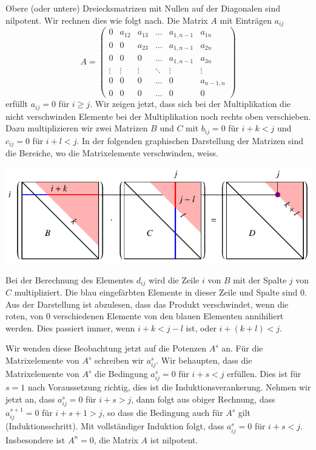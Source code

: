 \begin{beispiel}
Obere (oder untere) Dreiecksmatrizen mit Nullen auf der Diagonalen
sind nilpotent.
%
Wir rechnen dies wie folgt nach.
Die Matrix $A$ mit Einträgen $a_{i\!j}$
\[
A=\begin{pmatrix}
  0   &a_{12}&a_{13}&\dots &a_{1,n-1}&a_{1n}   \\
  0   &  0   &a_{23}&\dots &a_{1,n-1}&a_{2n}   \\
  0   &  0   &  0   &\dots &a_{1,n-1}&a_{3n}   \\
\vdots&\vdots&\vdots&\ddots&\vdots   &\vdots   \\
  0   &  0   &  0   &\dots &  0      &a_{n-1,n}\\
  0   &  0   &  0   &\dots &  0      &  0
\end{pmatrix}
\]
erfüllt $a_{i\!j}=0$ für $i\ge j$.
Wir zeigen jetzt, dass sich bei der Multiplikation die nicht
verschwinden Elemente bei der Multiplikation noch rechts oben
verschieben.
Dazu multiplizieren wir zwei Matrizen $B$ und $C$ mit
$b_{i\!j}=0$ für $i+k<j$ und $c_{i\!j}=0$ für $i+l<j$.
In der folgenden graphischen Darstellung der Matrizen sind die
Bereiche, wo die Matrixelemente verschwinden, weiss.
\begin{center}
\includegraphics{chapters/40-eigenwerte/images/nilpotent.pdf}
\end{center}
Bei der Berechnung des Elementes $d_{i\!j}$ wird die Zeile $i$ von $B$
mit der Spalte $j$ von $C$ multipliziert.
Die blau eingefärbten Elemente in dieser Zeile und Spalte sind $0$.
Aus der Darstellung ist abzulesen, dass das Produkt verschwindet, 
wenn die roten, von $0$ verschiedenen Elemente von den blauen
Elementen annihiliert werden.
Dies passiert immer, wenn $i+k<j-l$ ist, oder $i+(k+l)< j$.

Wir wenden diese Beobachtung jetzt auf die Potenzen $A^s$ an.
Für die Matrixelemente von $A^s$ schreiben wir $a^s_{i\!j}$.
Wir behaupten, dass die Matrixelemente von $A^s$ die Bedingung
$a_{i\!j}^s=0$ für $i+s<j$ erfüllen.
Dies ist für $s=1$ nach Voraussetzung richtig, dies ist die
Induktionsverankerung.
Nehmen wir jetzt an, dass $a_{i\!j}^s=0$ für $i+s>j$, dann folgt
aus obiger Rechnung, dass $a_{i\!j}^{s+1}=0$ für $i+s+1>j$, so
dass die Bedingung auch für $A^s$ gilt (Induktionsschritt).
Mit vollständiger Induktion folgt, dass $a_{i\!j}^s=0$ für $i+s<j$.
Insbesondere ist $A^n=0$, die Matrix $A$ ist nilpotent.
\end{beispiel}


